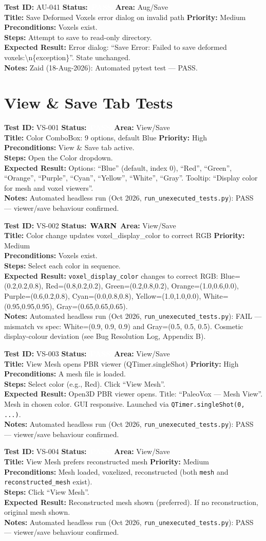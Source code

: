 \documentclass[12pt,a4paper]{article}
\newcommand{\statuspass}{\colorbox{statusgreen}{\textcolor{white}{\textbf{\,PASS\,}}}}
\newcommand{\statuswarn}{\colorbox{statusyellow}{\textcolor{black}{\textbf{\,WARN\,}}}}
\newcommand{\testcase}[9]{%
  \smallskip
  \noindent\textbf{Test ID:} #1 \hfill \textbf{Status:} #2 \hfill \textbf{Area:} #3 \\
  \textbf{Title:} #4 \hfill \textbf{Priority:} #5 \\[0.3em]
  \textbf{Preconditions:} #6 \\[0.3em]
  \textbf{Steps:} #7 \\[0.3em]
  \textbf{Expected Result:} #8 \\
  \textbf{Notes:} #9
  \smallskip
}
\begin{document}
\testcase{AU-041}{\statuspass}{Aug/Save}{Save Deformed Voxels error dialog on invalid path}{Medium}{Voxels exist.}{Attempt to save to read-only directory.}{Error dialog: ``Save Error: Failed to save deformed voxels:\textbackslash n\{exception\}''. State unchanged.}{Zaid (18-Aug-2026): Automated pytest test --- PASS.}



\section{View \& Save Tab Tests}

\testcase{VS-001}{\statuspass}{View/Save}{Color ComboBox: 9 options, default Blue}{High}{View \& Save tab active.}{Open the Color dropdown.}{Options: ``Blue'' (default, index 0), ``Red'', ``Green'', ``Orange'', ``Purple'', ``Cyan'', ``Yellow'', ``White'', ``Gray''. Tooltip: ``Display color for mesh and voxel viewers''.}{Automated headless run (Oct 2026, \texttt{run\_unexecuted\_tests.py}): PASS --- viewer/save behaviour confirmed.}


\testcase{VS-002}{\statuswarn}{View/Save}{Color change updates voxel\_display\_color to correct RGB}{Medium}{Voxels exist.}{Select each color in sequence.}{\texttt{voxel\_display\_color} changes to correct RGB: Blue=(0.2,0.2,0.8), Red=(0.8,0.2,0.2), Green=(0.2,0.8,0.2), Orange=(1.0,0.6,0.0), Purple=(0.6,0.2,0.8), Cyan=(0.0,0.8,0.8), Yellow=(1.0,1.0,0.0), White=(0.95,0.95,0.95), Gray=(0.65,0.65,0.65).}{Automated headless run (Oct 2026, \texttt{run\_unexecuted\_tests.py}): FAIL --- mismatch vs spec: White=(0.9, 0.9, 0.9) and Gray=(0.5, 0.5, 0.5). Cosmetic display-colour deviation (see Bug Resolution Log, Appendix B).}


\testcase{VS-003}{\statuspass}{View/Save}{View Mesh opens PBR viewer (QTimer.singleShot)}{High}{A mesh file is loaded.}{Select color (e.g., Red). Click ``View Mesh''.}{Open3D PBR viewer opens. Title: ``PaleoVox --- Mesh View''. Mesh in chosen color. GUI responsive. Launched via \texttt{QTimer.singleShot(0, ...)}.}{Automated headless run (Oct 2026, \texttt{run\_unexecuted\_tests.py}): PASS --- viewer/save behaviour confirmed.}


\testcase{VS-004}{\statuspass}{View/Save}{View Mesh prefers reconstructed mesh}{Medium}{Mesh loaded, voxelized, reconstructed (both \texttt{mesh} and \texttt{reconstructed\_mesh} exist).}{Click ``View Mesh''.}{Reconstructed mesh shown (preferred). If no reconstruction, original mesh shown.}{Automated headless run (Oct 2026, \texttt{run\_unexecuted\_tests.py}): PASS --- viewer/save behaviour confirmed.}
\end{document}
